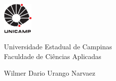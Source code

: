 





\thispagestyle{empty}

\begin{minipage}{.2\textwidth}
	\includegraphics[width=1.5cm]{img/unicamp.pdf}
\end{minipage}
\hspace*{\fill}
\begin{minipage}{.7\textwidth}
	{\large Universidade Estadual de Campinas\\
		Faculdade de Ciências Aplicadas}
\end{minipage}
\vspace*{1.5cm}

\begin{center}
	\large Wilmer Dario Urango Narvaez
\end{center}
\vspace*{3.0cm}

